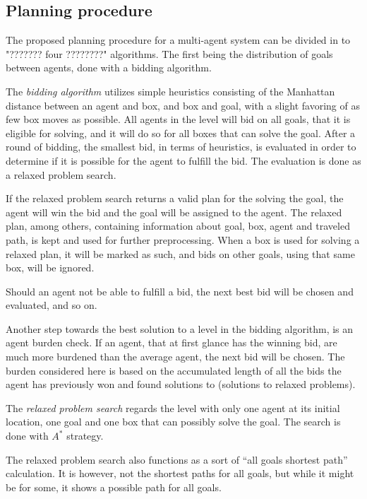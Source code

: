 \documentclass[Main]{subfiles}
\begin{document}
\subsection{Planning procedure}

The proposed planning procedure for a multi-agent system can be divided in to "??????? four ????????" algorithms. The first being the distribution of goals between agents, done with a bidding algorithm\citep{VanderKrogt2005}. 

The \textit{bidding algorithm} utilizes simple heuristics consisting of the Manhattan distance between an agent and box, and box and goal, with a slight favoring of as few box moves as possible. All agents in the level will bid on all goals, that it is eligible for solving, and it will do so for all boxes that can solve the goal. After a round of bidding, the smallest bid, in terms of heuristics, is evaluated in order to determine if it is possible for the agent to fulfill the bid. The evaluation is done as a relaxed problem search. 

If the relaxed problem search returns a valid plan for the solving the goal, the agent will win the bid and the goal will be assigned to the agent. The relaxed plan, among others, containing information about goal, box, agent and traveled path, is kept and used for further preprocessing. 
When a box is used for solving a relaxed plan, it will be marked as such, and bids on other goals, using that same box, will be ignored. 

Should an agent not be able to fulfill a bid, the next best bid will be chosen and evaluated, and so on. 

Another step towards the best solution to a level in the bidding algorithm, is an agent burden check. If an agent, that at first glance has the winning bid, are much more burdened than the average agent, the next bid will be chosen. The burden considered here is based on the accumulated length of all the bids the agent has previously won and found solutions to (solutions to relaxed problems). 

The \textit{relaxed problem search} regards the level with only one agent at its initial location, one goal and one box that can possibly solve the goal. The search is done with $A^*$ strategy. 

The relaxed problem search also functions as a sort of ``all goals shortest path'' calculation. It is however, not the shortest paths for all goals, but while it might be for some, it shows a possible path for all goals. 
\end{document}

